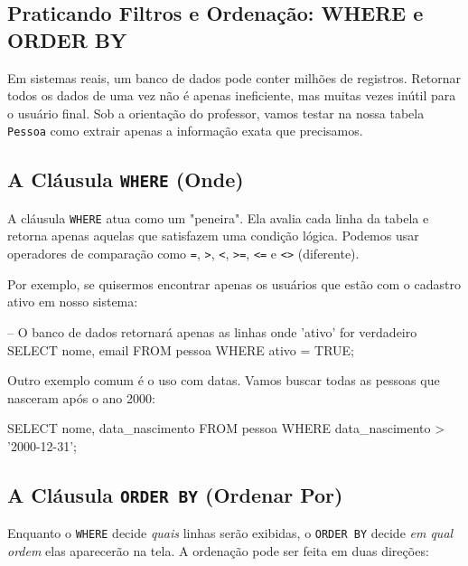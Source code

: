 \subsection{Praticando Filtros e Ordenação: WHERE e ORDER BY}

\begin{tcolorbox}[colback=blue!5,colframe=blue!40!black,title=Exercício Dirigido com o Professor: Refinando a Busca]
Em sistemas reais, um banco de dados pode conter milhões de registros. Retornar todos os dados de uma vez não é apenas ineficiente, mas muitas vezes inútil para o usuário final. Sob a orientação do professor, vamos testar na nossa tabela \texttt{Pessoa} como extrair apenas a informação exata que precisamos.
\end{tcolorbox}

\subsection{A Cláusula \texttt{WHERE} (Onde)}

A cláusula \texttt{WHERE} atua como um "peneira". Ela avalia cada linha da tabela e retorna apenas aquelas que satisfazem uma condição lógica. Podemos usar operadores de comparação como \texttt{=}, \texttt{>}, \texttt{<}, \texttt{>=}, \texttt{<=} e \texttt{<>} (diferente).



Por exemplo, se quisermos encontrar apenas os usuários que estão com o cadastro ativo em nosso sistema:

\begin{sqlcode}
-- O banco de dados retornará apenas as linhas onde 'ativo' for verdadeiro
SELECT nome, email 
FROM pessoa 
WHERE ativo = TRUE;
\end{sqlcode}

Outro exemplo comum é o uso com datas. Vamos buscar todas as pessoas que nasceram após o ano 2000:

\begin{sqlcode}
SELECT nome, data_nascimento 
FROM pessoa 
WHERE data_nascimento > '2000-12-31';
\end{sqlcode}

\subsection{A Cláusula \texttt{ORDER BY} (Ordenar Por)}

Enquanto o \texttt{WHERE} decide \textit{quais} linhas serão exibidas, o \texttt{ORDER BY} decide \textit{em qual ordem} elas aparecerão na tela. A ordenação pode ser feita em duas direções:


